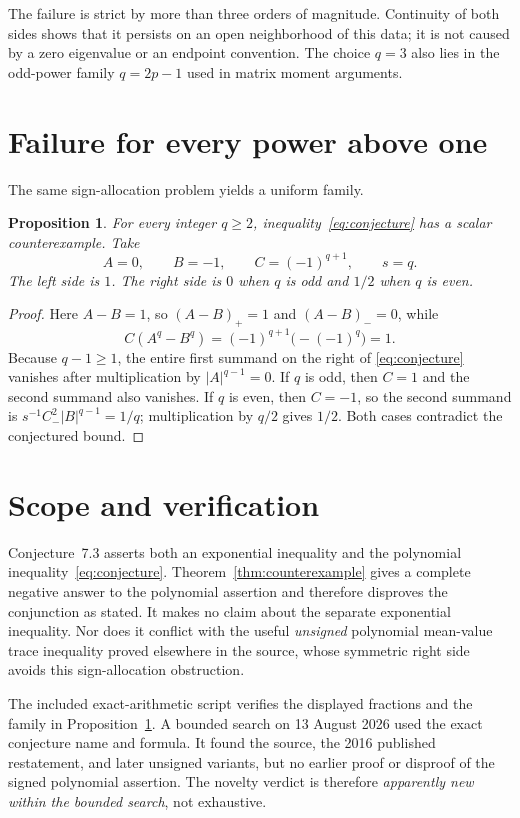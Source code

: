 \documentclass[10pt]{article}
\newtheorem{proposition}{Proposition}
\begin{document}
The failure is strict by more than three orders of magnitude. Continuity of
both sides shows that it persists on an open neighborhood of this data; it is
not caused by a zero eigenvalue or an endpoint convention. The choice $q=3$
also lies in the odd-power family $q=2p-1$ used in matrix moment arguments.

\section{Failure for every power above one}

The same sign-allocation problem yields a uniform family.

\begin{proposition}\label{prop:allq}
For every integer $q\geq2$, inequality~\eqref{eq:conjecture} has a scalar
counterexample. Take
\[
 A=0,\qquad B=-1,\qquad C=(-1)^{q+1},\qquad s=q.
\]
The left side is $1$. The right side is $0$ when $q$ is odd and $1/2$ when
$q$ is even.
\end{proposition}

\begin{proof}
Here $A-B=1$, so $(A-B)_+=1$ and $(A-B)_-=0$, while
\[
 C(A^q-B^q)=(-1)^{q+1}\big(-(-1)^q\big)=1.
\]
Because $q-1\geq1$, the entire first summand on the right of
\eqref{eq:conjecture} vanishes after multiplication by $|A|^{q-1}=0$.
If $q$ is odd, then $C=1$ and the second summand also vanishes. If $q$ is
even, then $C=-1$, so the second summand is
$s^{-1}C_-^2|B|^{q-1}=1/q$; multiplication by $q/2$ gives $1/2$.
Both cases contradict the conjectured bound.
\end{proof}

\section{Scope and verification}

Conjecture~7.3 asserts both an exponential inequality and the polynomial
inequality~\eqref{eq:conjecture}. Theorem~\ref{thm:counterexample} gives a
complete negative answer to the polynomial assertion and therefore disproves
the conjunction as stated. It makes no claim about the separate exponential
inequality. Nor does it conflict with the useful \emph{unsigned} polynomial
mean-value trace inequality proved elsewhere in the source, whose symmetric
right side avoids this sign-allocation obstruction.

The included exact-arithmetic script verifies the displayed fractions and the
family in Proposition~\ref{prop:allq}. A bounded search on 13 August 2026 used
the exact conjecture name and formula. It found the source, the 2016 published
restatement, and later unsigned variants, but no earlier proof or disproof of
the signed polynomial assertion. The novelty verdict is therefore
\emph{apparently new within the bounded search}, not exhaustive.
\end{document}

